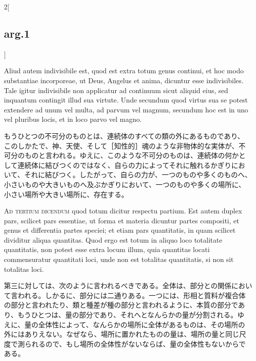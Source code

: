 \documentclass[paper=a4paper,fontsize=10pt,jafontsize=9pt,titlepage]{jlreq}
\begin{document}
\begin{paracol}{2}[\subsection{arg.1}]
\switchcolumn*

Aliud autem indivisibile est, quod est extra totum genus
 continui, et hoc modo substantiae incorporeae, ut Deus, Angelus et
 anima, dicuntur esse indivisibiles. Tale igitur indivisibile non
 applicatur ad continuum sicut aliquid eius, sed inquantum contingit
 illud sua virtute. Unde secundum quod virtus sua se potest extendere ad
 unum vel multa, ad parvum vel magnum, secundum hoc est in uno vel
 pluribus locis, et in loco parvo vel magno.

\switchcolumn

もうひとつの不可分のものとは、連続体のすべての類の外にあるものであり、
 このしかたで、神、天使、そして［知性的］魂のような非物体的な実体が、不
 可分のものと言われる。ゆえに、このような不可分のものは、連続体の何かと
 して連続体に結びつくのではなく、自らの力によってそれに触れるかぎりにお
 いて、それに結びつく。したがって、自らの力が、一つのものや多くのものへ、
 小さいものや大きいものへ及ぶかぎりにおいて、一つのものや多くの場所に、
 小さい場所や大きい場所に、存在する。

\switchcolumn*[\subsection{ad.3}]

{\scshape Ad tertium dicendum} quod totum dicitur respectu partium. Est autem
 duplex pars, scilicet pars essentiae, ut forma et materia dicuntur
 partes compositi, et genus et differentia partes speciei; et etiam pars
 quantitatis, in quam scilicet dividitur aliqua quantitas. Quod ergo est
 totum in aliquo loco totalitate quantitatis, non potest esse extra
 locum illum, quia quantitas locati commensuratur quantitati loci, unde
 non est totalitas quantitatis, si non sit totalitas loci.

\switchcolumn

第三に対しては、次のように言われるべきである。全体は、部分との関係におい
 て言われる。しかるに、部分には二通りある。一つには、形相と質料が複合体
 の部分と言われたり、類と種差が種の部分と言われるように、本質の部分であ
 り、もうひとつは、量の部分であり、それへとなんらかの量が分割される。ゆ
 えに、量の全体性によって、なんらかの場所に全体があるものは、その場所の
 外にはありえない。なぜなら、場所に置かれたものの量は、場所の量と同じ尺
 度で測られるので、もし場所の全体性がないならば、量の全体性もないからで
 ある。

\switchcolumn*


\end{paracol}
\end{document}
